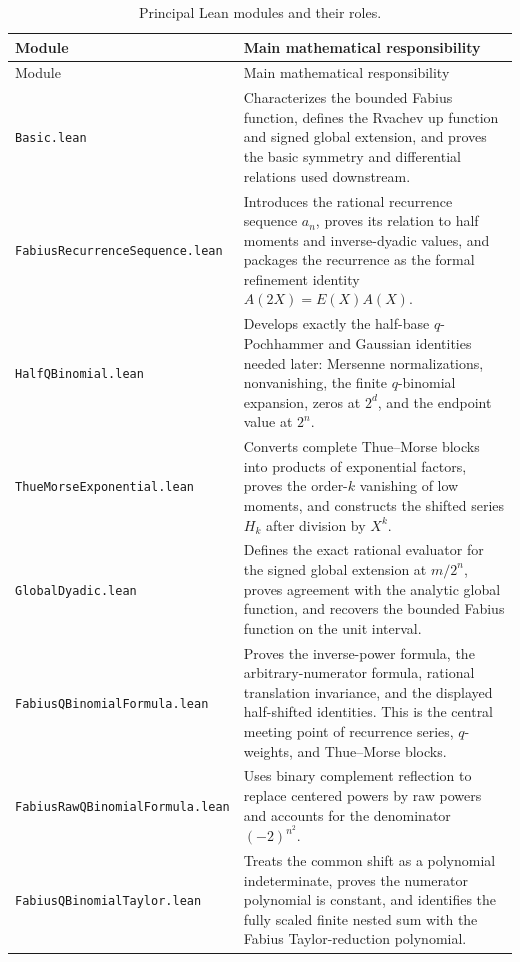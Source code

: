 \documentclass[11pt,oneside]{article}
\theoremstyle{definition}
\theoremstyle{remark}
\begin{document}
\begin{longtable}{@{}L{0.37\textwidth}L{0.56\textwidth}@{}}
\caption{Principal Lean modules and their roles.}\label{p3:tab:leanmodules}\\
\toprule
Module & Main mathematical responsibility\\
\midrule
\endfirsthead
\toprule
Module & Main mathematical responsibility\\
\midrule
\endhead
\texttt{Basic.lean}
& Characterizes the bounded Fabius function, defines the Rvachev up function
and signed global extension, and proves the basic symmetry and differential
relations used downstream.\\[0.35em]
\texttt{FabiusRecurrenceSequence.lean}
& Introduces the rational recurrence sequence $a_n$, proves its relation to
half moments and inverse-dyadic values, and packages the recurrence as the
formal refinement identity $A(2X)=E(X)A(X)$.\\[0.35em]
\texttt{HalfQBinomial.lean}
& Develops exactly the half-base $q$-Pochhammer and Gaussian identities
needed later: Mersenne normalizations, nonvanishing, the finite
$q$-binomial expansion, zeros at $2^d$, and the endpoint value at $2^n$.\\[0.35em]
\texttt{ThueMorseExponential.lean}
& Converts complete Thue--Morse blocks into products of exponential factors,
proves the order-$k$ vanishing of low moments, and constructs the shifted
series $H_k$ after division by $X^k$.\\[0.35em]
\texttt{GlobalDyadic.lean}
& Defines the exact rational evaluator for the signed global extension at
$m/2^n$, proves agreement with the analytic global function, and recovers the
bounded Fabius function on the unit interval.\\[0.35em]
\texttt{FabiusQBinomialFormula.lean}
& Proves the inverse-power formula, the arbitrary-numerator formula, rational
translation invariance, and the displayed half-shifted identities.  This is
the central meeting point of recurrence series, $q$-weights, and Thue--Morse
blocks.\\[0.35em]
\texttt{FabiusRawQBinomialFormula.lean}
& Uses binary complement reflection to replace centered powers by raw powers
and accounts for the denominator $(-2)^{n^2}$.\\[0.35em]
\texttt{FabiusQBinomialTaylor.lean}
& Treats the common shift as a polynomial indeterminate, proves the numerator
polynomial is constant, and identifies the fully scaled finite nested sum
with the Fabius Taylor-reduction polynomial.\\[0.35em]

\end{longtable}
\end{document}
